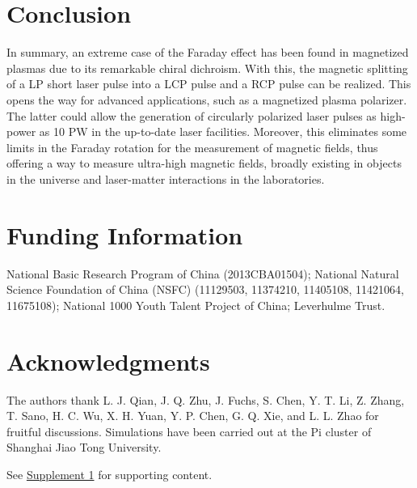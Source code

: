 \documentclass[%
aps,
preprint,
showpacs,
preprintnumbers,
 amsmath,
 amssymb,
 prl,
]{revtex4-1}
\begin{document}
\section{Conclusion}

In summary, an extreme case of the Faraday effect has been found in magnetized plasmas due to its remarkable chiral dichroism. With this, the magnetic splitting of a LP short laser pulse into a LCP pulse and a RCP pulse can be realized. This opens the way for advanced applications, such as a magnetized plasma polarizer. The latter could allow the generation of circularly polarized laser pulses as high-power as 10 PW in the up-to-date laser facilities. Moreover, this eliminates some limits in the Faraday rotation for the measurement of magnetic fields, thus offering a way to measure ultra-high magnetic fields, broadly existing in objects in the universe and laser-matter interactions in the laboratories.

\section*{Funding Information}
National Basic Research Program of China (2013CBA01504); National Natural Science Foundation of China (NSFC) (11129503, 11374210, 11405108, 11421064, 11675108); National 1000 Youth Talent Project of China; Leverhulme Trust.

\section*{Acknowledgments}
The authors thank L. J. Qian, J. Q. Zhu, J. Fuchs, S. Chen, Y. T. Li, Z. Zhang, T. Sano, H. C. Wu, X. H. Yuan, Y. P. Chen, G. Q. Xie, and L. L. Zhao for fruitful discussions. Simulations have been carried out at the Pi cluster of Shanghai Jiao Tong University.

\bigskip \noindent See \href{link}{Supplement 1} for supporting content.

%


\end{document}

